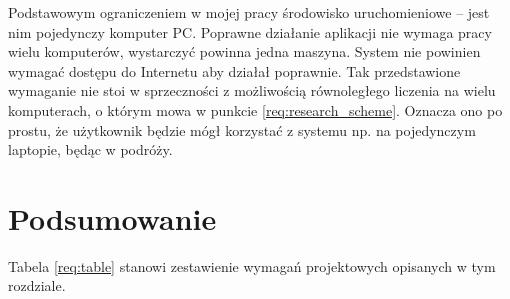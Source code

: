 \documentclass[../thesis.tex]{subfiles}
\begin{document}
Podstawowym ograniczeniem w mojej pracy środowisko uruchomieniowe -- jest nim pojedynczy komputer PC. Poprawne działanie aplikacji nie wymaga pracy wielu komputerów, wystarczyć powinna jedna maszyna.  System nie powinien wymagać dostępu do Internetu aby działał poprawnie. Tak przedstawione wymaganie nie stoi w sprzeczności z możliwością równoległego liczenia na wielu komputerach, o którym mowa w punkcie \ref{req:research_scheme}. Oznacza ono po prostu, że użytkownik będzie mógł korzystać z systemu np. na pojedynczym laptopie, będąc w podróży.

\section{Podsumowanie}

Tabela \ref{req:table} stanowi zestawienie wymagań projektowych opisanych w tym rozdziale.
\end{document}
